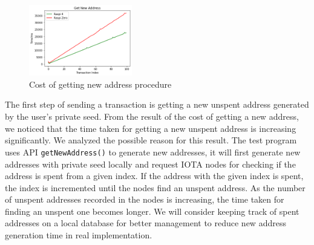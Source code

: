 \begin{figure}[h]
    \centering
    \includegraphics[width=0.4\textwidth,trim={0 0 0 0},clip]{figs/get_new_address.png}
    \caption{Cost of getting new address procedure}
    \label{fig:cost_getting_new_address}
\end{figure}

The first step of sending a transaction is getting a new unspent address generated by the user's private seed.
From the result of the cost of getting a new address, we noticed that the time taken for getting a new unspent address is increasing significantly. 
We analyzed the possible reason for this result. The test program uses API \texttt{getNewAddress()} to generate new addresses, it will first generate new addresses with private seed locally and request IOTA nodes for checking if the address is spent from a given index.
If the address with the given index is spent, the index is incremented until the nodes find an unspent address. As the number of unspent addresses recorded in the nodes is increasing, the time taken for finding an unspent one becomes longer. 
We will consider keeping track of spent addresses on a local database for better management to reduce new address generation time in real implementation.




